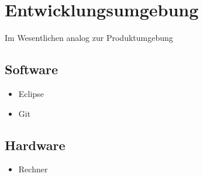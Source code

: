 \documentclass[a4paper,10pt]{scrartcl}
\begin{document}
\section{Entwicklungsumgebung}
Im Wesentlichen analog zur Produktumgebung

\subsection{Software}
\begin{itemize}
\item Eclipse
\item Git
\end{itemize}
\subsection{Hardware}
\begin{itemize}
\item Rechner
\end{itemize}


\clearpage


{}

\end{document}
